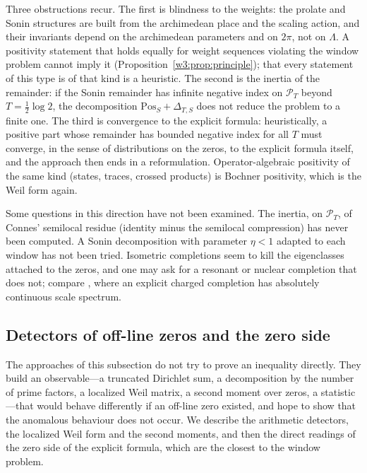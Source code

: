 \documentclass[11pt]{amsart}
\theoremstyle{definition}
\theoremstyle{remark}
\numberwithin{equation}{section}
\newcommand{\PT}{\mathcal{P}_T}                        %
\begin{document}
Three obstructions recur. The first is blindness to the weights: the prolate and Sonin structures
are built from the archimedean place and the scaling action, and their invariants depend on the
archimedean parameters and on $2\pi$, not on $\Lambda$. A positivity statement that holds equally
for weight sequences violating the window problem cannot imply it
(Proposition~\ref{w3:prop:principle}); that every statement of this type is of that kind is a
heuristic. The second is the inertia of the remainder: if the Sonin remainder has infinite
negative index on $\PT$ beyond $T=\frac12\log2$, the decomposition $\mathrm{Pos}_S+\Delta_{T,S}$
does not reduce the problem to a finite one. The third is convergence to the explicit formula:
heuristically, a positive part whose remainder has bounded negative index for all $T$ must
converge, in the sense of distributions on the zeros, to the explicit formula itself, and the
approach then ends in a reformulation. Operator-algebraic
positivity of the same kind (states, traces, crossed products) is Bochner positivity, which is the
Weil form again.

Some questions in this direction have not been examined. The inertia, on $\PT$, of Connes'
semilocal residue (identity minus the semilocal compression) has never been computed. A Sonin
decomposition with parameter $\eta<1$ adapted to each window has not been tried. Isometric
completions seem to kill the eigenclasses attached to the zeros, and one may ask for a resonant or
nuclear completion that does not; compare \cite[Theorem~10.7]{P40}, where an explicit charged
completion has absolutely continuous scale spectrum.


\subsection{Detectors of off-line zeros and the zero side}
\label{w6:sec:detectors}\label{w6:fam:R16}

The approaches of this subsection do not try to prove an inequality directly. They build an
observable---a truncated Dirichlet sum, a decomposition by the number of prime factors, a localized
Weil matrix, a second moment over zeros, a statistic---that would behave differently if an off-line
zero existed, and hope to show that the anomalous behaviour does not occur. We describe the
arithmetic detectors, the localized Weil form and the second moments, and then the direct readings
of the zero side of the explicit formula, which are the closest to the window problem.
\end{document}
